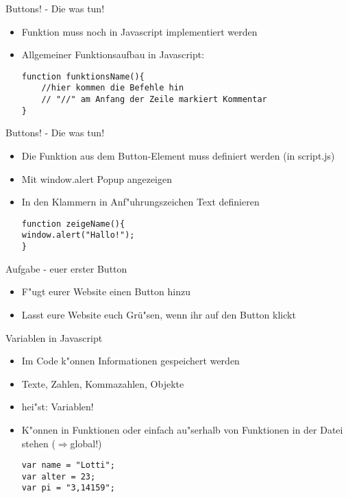 \documentclass[18pt]{beamer}
\begin{document}
\begin{frame}[fragile]{Buttons! - Die was tun!}
\begin {itemize}
\item Funktion muss noch in Javascript implementiert werden
\item Allgemeiner Funktionsaufbau in Javascript:
\begin{lstlisting}
function funktionsName(){
	//hier kommen die Befehle hin
	// "//" am Anfang der Zeile markiert Kommentar
}
\end{lstlisting}
\end {itemize}
\end{frame}




\begin{frame}[fragile]{Buttons! - Die was tun!}
\begin {itemize}
\item Die Funktion aus dem Button-Element muss definiert werden (in script.js)
\item  Mit window.alert Popup angezeigen
\item In den Klammern in Anf"uhrungszeichen Text definieren
\begin{lstlisting}
function zeigeName(){
window.alert("Hallo!");
}
\end{lstlisting}
\end {itemize}
\end{frame}



\begin{frame}[fragile]{Aufgabe - euer erster Button}
\begin {itemize}
\item F"ugt eurer Website einen Button hinzu
\item Lasst eure Website euch Grü"sen, wenn ihr auf den Button klickt
\end {itemize}
\end{frame}


\begin{frame}[fragile]{Variablen in Javascript}
\begin{itemize}
\item Im Code k"onnen Informationen gespeichert werden
\item Texte, Zahlen, Kommazahlen, Objekte
\item hei"st: Variablen! 
\item K"onnen in Funktionen oder einfach au"serhalb von Funktionen in der Datei stehen ($\Rightarrow$global!)
\begin{lstlisting}
var name = "Lotti";
var alter = 23;
var pi = "3,14159";
\end{lstlisting}
\end{itemize}
\end{frame}
\end{document}
